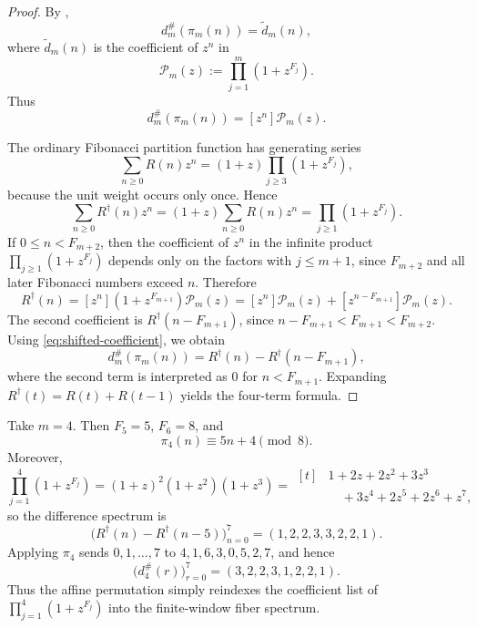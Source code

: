 \begin{proof}
By ,
\[
  d_m^\#(\pi_m(n))=\widetilde d_m(n),
\]
where \(\widetilde d_m(n)\) is the coefficient of \(z^n\) in
\[
  \mathcal P_m(z):=\prod_{j=1}^m(1+z^{F_j}).
\]
Thus
\begin{equation}\label{eq:shifted-coefficient}
  d_m^\#(\pi_m(n))=[z^n]\mathcal P_m(z).
\end{equation}

The ordinary Fibonacci partition function has generating series
\[
  \sum_{n\ge 0}R(n)z^n=(1+z)\prod_{j\ge 3}(1+z^{F_j}),
\]
because the unit weight occurs only once.  Hence
\begin{equation}\label{eq:indexed-generating}
  \sum_{n\ge 0}R^\dagger(n)z^n
  =
  (1+z)\sum_{n\ge 0}R(n)z^n
  =
  \prod_{j\ge 1}(1+z^{F_j}).
\end{equation}
If \(0\le n<F_{m+2}\), then the coefficient of \(z^n\) in the infinite product
\(\prod_{j\ge 1}(1+z^{F_j})\) depends only on the factors with \(j\le m+1\),
since \(F_{m+2}\) and all later Fibonacci numbers exceed \(n\).  Therefore
\[
  R^\dagger(n)
  =
  [z^n](1+z^{F_{m+1}})\mathcal P_m(z)
  =
  [z^n]\mathcal P_m(z)+[z^{n-F_{m+1}}]\mathcal P_m(z).
\]
The second coefficient is \(R^\dagger(n-F_{m+1})\), since
\(n-F_{m+1}<F_{m+1}<F_{m+2}\).  Using \eqref{eq:shifted-coefficient}, we
obtain
\[
  d_m^\#(\pi_m(n))
  =
  R^\dagger(n)-R^\dagger(n-F_{m+1}),
\]
where the second term is interpreted as \(0\) for \(n<F_{m+1}\).  Expanding
\(R^\dagger(t)=R(t)+R(t-1)\) yields the four-term formula.
\end{proof}

\begin{example}
\label{ex:m4-partition-difference}
Take \(m=4\).  Then \(F_5=5\), \(F_6=8\), and
\[
  \pi_4(n)\equiv 5n+4 \pmod 8.
\]
Moreover,
\[
  \prod_{j=1}^4(1+z^{F_j})
  =
  (1+z)^2(1+z^2)(1+z^3)
  =
  \begin{aligned}[t]
  &1+2z+2z^2+3z^3\\
  &\quad{}+3z^4+2z^5+2z^6+z^7,
  \end{aligned}
\]
so the difference spectrum is
\[
  \bigl(R^\dagger(n)-R^\dagger(n-5)\bigr)_{n=0}^{7}
  =
  (1,2,2,3,3,2,2,1).
\]
Applying \(\pi_4\) sends \(0,1,\dots,7\) to \(4,1,6,3,0,5,2,7\), and hence
\[
  \bigl(d_4^\#(r)\bigr)_{r=0}^{7}
  =
  (3,2,2,3,1,2,2,1).
\]
Thus the affine permutation simply reindexes the coefficient list of
\(\prod_{j=1}^4(1+z^{F_j})\) into the finite-window fiber spectrum.
\end{example}

